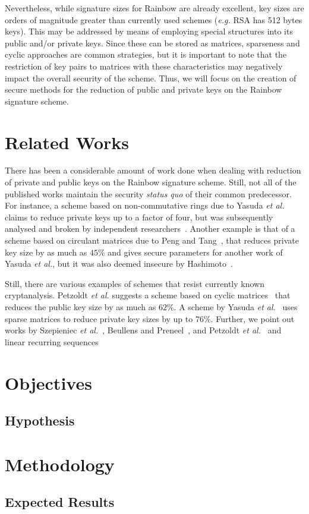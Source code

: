 \documentclass[10pt]{article}
\begin{document}
Nevertheless, while signature sizes for Rainbow are already excellent, key sizes are orders of magnitude greater than currently used schemes (\emph{e.g.} RSA has 512 bytes keys). This may be addressed by means of employing special structures into its public and/or private keys. Since these can be stored as matrices, sparseness and cyclic approaches are common strategies, but it is important to note that the restriction of key pairs to matrices with these characteristics may negatively impact the overall security of the scheme. Thus, we will focus on the creation of secure methods for the reduction of public and private keys on the Rainbow signature scheme.

\section{Related Works}

There has been a considerable amount of work done when dealing with reduction of private and public keys on the Rainbow signature scheme. Still, not all of the published works maintain the security \emph{status quo} of their common predecessor. For instance, a scheme based on non-commutative rings due to Yasuda \emph{et al.}~\cite{} claims to reduce private keys up to a factor of four, but was subsequently analysed and broken by independent researchers~\cite{}. Another example is that of a scheme based on circulant matrices due to Peng and Tang~\cite{}, that reduces private key size by as much as $45\%$ and gives secure parameters for another work of Yasuda \emph{et al.}, but it was also deemed insecure by Hashimoto~\cite{}. 

Still, there are various examples of schemes that resist currently known cryptanalysis. Petzoldt \emph{et al.} suggests a scheme based on cyclic matrices~\cite{} that reduces the public key size by as much as $62\%$. A scheme by Yasuda \emph{et al.}~\cite{} uses sparse matrices to reduce private key sizes by up to $76\%$. Further, we point out works by Szepieniec \emph{et al.}~\cite{},  Beullens and Preneel~\cite{}, and Petzoldt \emph{et al.}~\cite{}  and linear recurring sequences~\

\section{Objectives}

\subsection{Hypothesis}

\section{Methodology}

\subsection{Expected Results}



\end{document}
